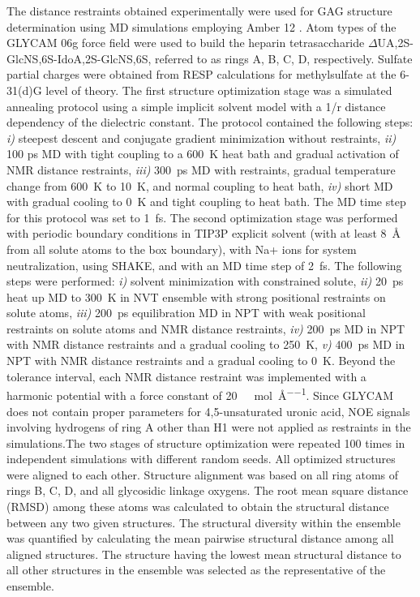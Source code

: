 The distance restraints obtained experimentally were used for GAG structure
determination using MD simulations employing Amber 12 \cite{case_amber_12}. Atom
types of the GLYCAM 06g force field \cite{kirschner_glycam06:_2008} were used to
build the heparin tetrasaccharide $\Delta$UA,2S-GlcNS,6S-IdoA,2S-GlcNS,6S,
referred to as rings A, B, C, D, respectively. Sulfate partial charges were
obtained from RESP calculations for methylsulfate at the 6-31(d)G level of
theory. The first structure optimization stage was a simulated annealing
protocol using a simple implicit solvent model with a 1/r distance dependency of
the dielectric constant. The protocol contained the following steps: \textit{i)}
steepest descent and conjugate gradient minimization without restraints,
\textit{ii)} 100 ps MD with tight coupling to a \SI{600}{\kelvin} heat bath and
gradual activation of NMR distance restraints, \textit{iii)}
\SI{300}{\pico\second} MD with restraints, gradual temperature change from
\SI{600}{\kelvin} to \SI{10}{\kelvin}, and normal coupling to heat bath,
\textit{iv)} short MD with gradual cooling to \SI{0}{\kelvin} and tight coupling
to heat bath. The MD time step for this protocol was set to
\SI{1}{\femto\second}. The second optimization stage was performed with periodic
boundary conditions in TIP3P explicit solvent (with at least \SI{8}{\angstrom}
from all solute atoms to the box boundary), with Na+ ions for system
neutralization, using SHAKE, and with an MD time step of \SI{2}{\femto\second}.
The following steps were performed: \textit{i)} solvent minimization with
constrained solute, \textit{ii)} \SI{20}{\pico\second} heat up MD to
\SI{300}{\kelvin} in NVT ensemble with strong positional restraints on solute
atoms, \textit{iii)} \SI{200}{\pico\second} equilibration MD in NPT with weak
positional restraints on solute atoms and NMR distance restraints, \textit{iv)}
\SI{200}{\pico\second} MD in NPT with NMR distance restraints and a gradual
cooling to \SI{250}{\kelvin}, \textit{v)} \SI{400}{\pico\second} MD in NPT with
NMR distance restraints and a gradual cooling to \SI{0}{\kelvin}. Beyond the
tolerance interval, each NMR distance restraint was implemented with a harmonic
potential with a force constant of \SI{20}{\kilo\calory\per\mole\per\angstrom}.
Since GLYCAM does not contain proper parameters for 4,5-unsaturated uronic acid,
NOE signals involving hydrogens of ring A other than H1 were not applied as
restraints in the simulations.The two stages of structure optimization were
repeated 100 times in independent simulations with different random seeds. All
optimized structures were aligned to each other. Structure alignment was based
on all ring atoms of rings B, C, D, and all glycosidic linkage oxygens. The root
mean square distance (RMSD) among these atoms was calculated to obtain the
structural distance between any two given structures. The structural diversity
within the ensemble was quantified by calculating the mean pairwise structural
distance among all aligned structures. The structure having the lowest mean
structural distance to all other structures in the ensemble was selected as the
representative of the ensemble.

